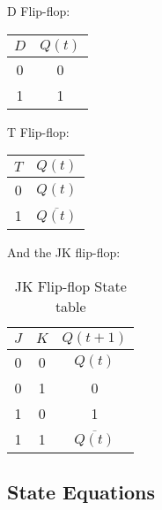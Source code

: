 \documentclass[12pt letter]{report}
\begin{document}
D Flip-flop:
\begin{table}[h!]
  \begin{center}
    \begin{tabular}{|c|c|}
      \hline
      $D$ & $Q \left( t \right) $ \\ [0.5ex]
      \hline
      \hline
      0   & 0                     \\
      1   & 1                     \\
      \hline
    \end{tabular}
  \end{center}
\end{table}

T Flip-flop:
\begin{table}[H]
  \begin{center}
    \begin{tabular}{|c|c|}
      \hline
      $T$ & $Q \left( t \right) $            \\ [0.5ex]
      \hline
      \hline
      0   & $Q \left( t \right) $            \\
      1   & $\overline{Q \left( t \right) }$ \\
      \hline
    \end{tabular}
  \end{center}
\end{table}

And the JK flip-flop:
\begin{table}[H]
  \begin{center}
    \begin{tabular}{|c c|c|}
      \hline
      $J$ & $K$ & $Q \left( t + 1 \right) $        \\ [0.5ex]
      \hline
      \hline
      0   & 0   & $Q \left( t \right) $            \\
      0   & 1   & 0                                \\
      1   & 0   & 1                                \\
      1   & 1   & $\overline{Q \left( t \right) }$ \\
      \hline
    \end{tabular}
    \caption{JK Flip-flop State table}
  \end{center}
\end{table}

\subsection{State Equations}
\end{document}
